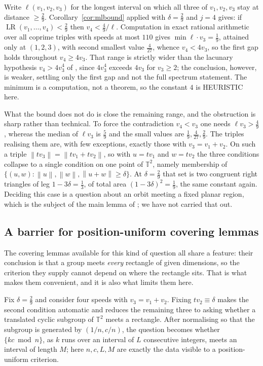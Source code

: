 \documentclass[11pt]{amsart}
\theoremstyle{plain}
\theoremstyle{definition}
\newcommand{\LR}{\operatorname{LR}}
\newcommand{\nrm}[1]{\left\lVert #1 \right\rVert}
\begin{document}
Write $\ell(v_1,v_2,v_3)$ for the longest interval on which all three of $v_1,v_2,v_3$ stay at
distance $\ge\tfrac29$. Corollary~\ref{cor:mlbound} applied with $\delta=\tfrac29$ and $j=4$ gives:
if $\LR(v_1,\dots,v_4)<\tfrac29$ then $v_4<\tfrac{4}{9}/\ell$. Computation in exact rational arithmetic over all coprime
triples with speeds at most $110$ gives $\min\ell\cdot v_3=\tfrac19$, attained only at $(1,2,3)$,
with second smallest value $\tfrac4{27}$, whence
$v_4<4v_3$, so the first gap holds throughout $v_4\ge4v_3$. That range is strictly wider than the
lacunary hypothesis $v_4>4v_3^{4}$ of \cite[Thm.~2.2]{kravitz}, since $4v_3^{4}$ exceeds $4v_3$ for
$v_3\ge2$; the conclusion, however, is weaker, settling only the first gap and not the full spectrum
statement. The minimum is a computation, not a theorem, so the constant $4$ is HEURISTIC here.

What the bound does not do is close the remaining range, and the obstruction is sharp rather than
technical. To force the contradiction $v_4<v_3$ one needs $\ell v_3>\tfrac49$, whereas the median of
$\ell v_3$ is $\tfrac59$ and the small values are $\tfrac19,\tfrac4{27},\tfrac29$. The triples
realising them are, with few exceptions, exactly those with $v_3=v_1+v_2$. On such a triple
$\nrm{tv_3}=\nrm{tv_1+tv_2}$, so with $u=tv_1$ and $w=tv_2$ the three conditions collapse to a single
condition on one point of $\mathbb{T}^2$, namely membership of
$\{(u,w):\nrm{u},\nrm{w},\nrm{u+w}\ge\delta\}$. At $\delta=\tfrac29$ that set is two congruent right
triangles of leg $1-3\delta=\tfrac13$, of total area $(1-3\delta)^2=\tfrac19$, the same constant
again. Deciding this case is a question about an orbit meeting a fixed planar region, which is the
subject of the main lemma of \cite{bhk}; we have not carried that out.

\subsection{A barrier for position-uniform covering lemmas}\label{sec:barrier}

The covering lemmas available for this kind of question all share a feature: their conclusion is
that a group meets \emph{every} rectangle of given dimensions, so the criterion they supply cannot
depend on where the rectangle sits. That is what makes them convenient, and it is also what limits
them here.

Fix $\delta=\tfrac29$ and consider four speeds with $v_3=v_1+v_2$. Fixing $tv_2\equiv\delta$ makes
the second condition automatic and reduces the remaining three to asking whether a translated
cyclic subgroup of $\mathbb{T}^2$ meets a rectangle. After normalising so that the subgroup is
generated by $(1/n,c/n)$, the question becomes whether $\{kc \bmod n\}$, as $k$ runs over an
interval of $L$ consecutive integers, meets an interval of length $M$; here $n,c,L,M$ are exactly
the data visible to a position-uniform criterion.
\end{document}
